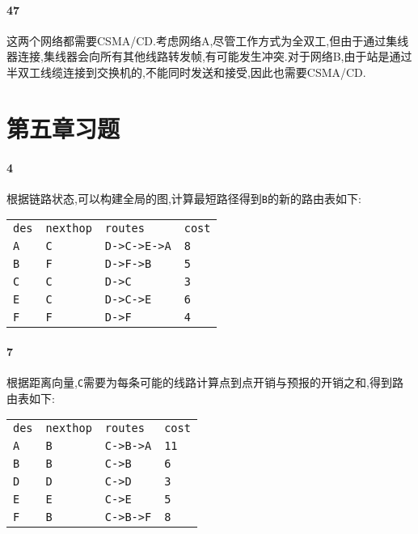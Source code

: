 \documentclass[a4paper]{article}
\begin{document}
\paragraph{47}
这两个网络都需要CSMA/CD.考虑网络A,尽管工作方式为全双工,但由于通过集线器连接,集线器会向所有其他线路转发帧,有可能发生冲突.对于网络B,由于站是通过半双工线缆连接到交换机的,不能同时发送和接受,因此也需要CSMA/CD.
\section{第五章习题}
\paragraph{4}
根据链路状态,可以构建全局的图,计算最短路径得到\verb|B|的新的路由表如下:
\begin{table}[H]
    \begin{tabular}{|llll|}
        \hline
        \verb|des| & \verb|nexthop| & \verb|routes|     & \verb|cost| \\
        \verb|A|   & \verb|C|       & \verb|D->C->E->A| & \verb|8|    \\
        \verb|B|   & \verb|F|       & \verb|D->F->B|    & \verb|5|    \\
        \verb|C|   & \verb|C|       & \verb|D->C|       & \verb|3|    \\
        \verb|E|   & \verb|C|       & \verb|D->C->E|    & \verb|6|    \\
        \verb|F|   & \verb|F|       & \verb|D->F|       & \verb|4|    \\ \hline
    \end{tabular}
\end{table}
\paragraph{7}
根据距离向量,\verb|C|需要为每条可能的线路计算点到点开销与预报的开销之和,得到路由表如下:
\begin{table}[H]
    \begin{tabular}{|llll|}
        \hline
        \verb|des| & \verb|nexthop| & \verb|routes|  & \verb|cost| \\
        \verb|A|   & \verb|B|       & \verb|C->B->A| & \verb|11|   \\
        \verb|B|   & \verb|B|       & \verb|C->B|    & \verb|6|    \\
        \verb|D|   & \verb|D|       & \verb|C->D|    & \verb|3|    \\
        \verb|E|   & \verb|E|       & \verb|C->E|    & \verb|5|    \\
        \verb|F|   & \verb|B|       & \verb|C->B->F| & \verb|8|    \\ \hline
    \end{tabular}
\end{table}
\end{document}
